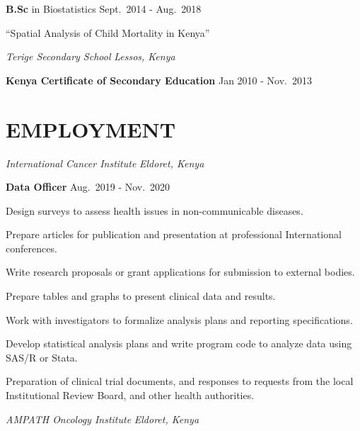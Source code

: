 \documentclass[12.5pt,]{article}
\providecommand{\tightlist}{%
  \setlength{\itemsep}{0pt}\setlength{\parskip}{0pt}}
\renewenvironment{itemize}{
  \begin{list}{}{
    \setlength{\leftmargin}{1.5em}
  }
}{
  \end{list}
}
\begin{document}
\begin{itemize}
\item
  \textbf{B.Sc} in Biostatistics \hfill Sept.~2014 - Aug.~2018

  \begin{itemize}
  \tightlist
  \item
    ``Spatial Analysis of Child Mortality in Kenya''
  \end{itemize}
\end{itemize}

\emph{Terige Secondary School} \hfill \emph{Lessos, Kenya}

\begin{itemize}
\tightlist
\item
  \textbf{Kenya Certificate of Secondary Education} \hfill Jan 2010 -
  Nov.~2013
\end{itemize}

\hypertarget{employment}{%
\section{\texorpdfstring{\textbf{EMPLOYMENT}}{EMPLOYMENT}}\label{employment}}

\emph{International Cancer Institute} \hfill \emph{Eldoret, Kenya}

\textbf{Data Officer} \hfill Aug.~2019 - Nov.~2020

\begin{itemize}
\tightlist
\item
  Design surveys to assess health issues in non-communicable diseases.
\item
  Prepare articles for publication and presentation at professional
  International conferences.
\item
  Write research proposals or grant applications for submission to
  external bodies.
\item
  Prepare tables and graphs to present clinical data and results.
\item
  Work with investigators to formalize analysis plans and reporting
  specifications.
\item
  Develop statistical analysis plans and write program code to analyze
  data using SAS/R or Stata.
\item
  Preparation of clinical trial documents, and responses to requests
  from the local Institutional Review Board, and other health
  authorities.
\end{itemize}

\emph{AMPATH Oncology Institute} \hfill \emph{Eldoret, Kenya}
\end{document}
